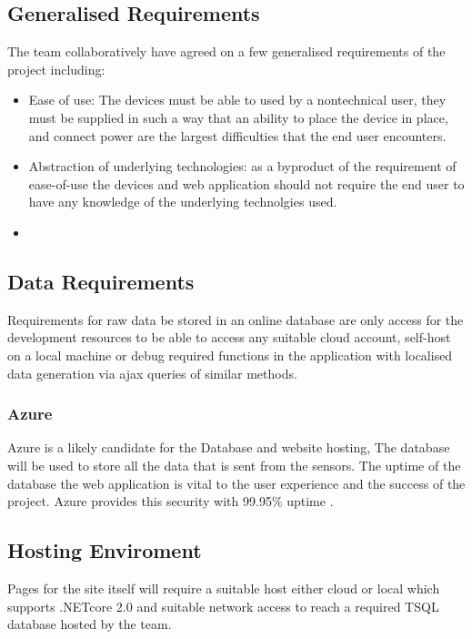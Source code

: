 \documentclass{article}
\begin{document}
        \subsection{Generalised Requirements}
            The team collaboratively have agreed on a few generalised requirements of the project
            including:
            \begin{itemize}
                \item Ease of use: The devices must be able to used by a nontechnical user, they must
                be supplied in such a way that an ability to place the device in place, and connect power
                are the largest difficulties that the end user encounters.
                \item Abstraction of underlying technologies: as a byproduct of the requirement of ease-of-use
                the devices and web application should not require the end user to have any knowledge of the 
                underlying technolgies used.
                \item 
            \end{itemize}
        \subsection{Data Requirements}
            Requirements for raw data be stored in an online database are only access
            for the development resources to be able to access any suitable cloud account, 
            self-host on a local machine or debug required functions in the application with 
            localised data generation via ajax queries of similar methods.
            
            \subsubsection{Azure}
                Azure is a likely candidate for the Database and website hosting, The database will be used to store 
                all the data that is sent from the sensors. The uptime of the database the web application is vital 
                to the user experience and the success of the project. Azure provides this security 
                with 99.95\% uptime \cite{AzureUptime}.

        \subsection{Hosting Enviroment}
            Pages for the site itself will require a suitable host either cloud or local which
            supports .NETcore 2.0\cite{DotNetCore2} and suitable network access to reach a
            required TSQL\cite{TSQL} database hosted by the team.
        
\end{document}
